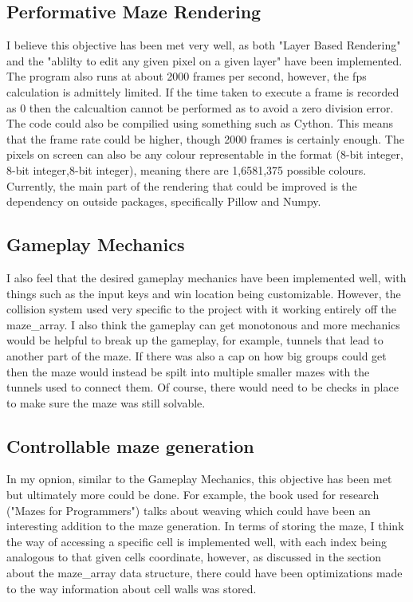 \documentclass{article}
\begin{document}
\subsection{Performative Maze Rendering}
I believe this objective has been met very well, as both "Layer Based Rendering" and the "ablilty to edit any given pixel on a given layer" have been implemented. The program also runs
at about 2000 frames per second, however, the fps calculation is admittely limited. If the time taken to execute a frame is recorded as 0 then the calcualtion cannot be performed as to avoid
a zero division error. The code could also be compilied using something such as Cython. This means that the frame rate could be higher, though 2000 frames is certainly enough. The pixels on screen can also be any colour representable in the format (8-bit integer, 8-bit integer,8-bit integer), meaning there are 1,6581,375 possible colours. Currently, the main part of the rendering that could be improved is the dependency on outside packages,
specifically Pillow and Numpy.

\subsection{Gameplay Mechanics}
I also feel that the desired gameplay mechanics have been implemented well, with things such as the input keys and win location being customizable. However, the collision system used 
very specific to the project with it working entirely off the maze\_array. I also think the gameplay can get monotonous and more mechanics would be helpful to break up the gameplay, for
example, tunnels that lead to another part of the maze. If there was also a cap on how big groups could get then the maze would instead be spilt into multiple smaller mazes with the tunnels
used to connect them. Of course, there would need to be checks in place to make sure the maze was still solvable.

\subsection{Controllable maze generation}
In my opnion, similar to the Gameplay Mechanics, this objective has been met but ultimately more could be done. For example, the book used for research ("Mazes for Programmers") talks 
about weaving which could have been an interesting addition to the maze generation. In terms of storing the maze, I think the way of accessing a specific cell is implemented well, with each index
being analogous to that given cells coordinate, however, as discussed in the section about the maze\_array data structure, there could have been optimizations made to the way information
about cell walls was stored.
\end{document}
